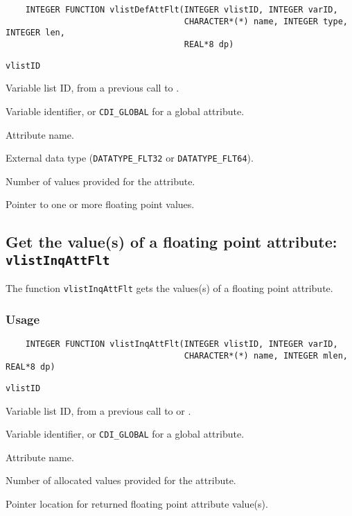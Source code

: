 \begin{verbatim}
    INTEGER FUNCTION vlistDefAttFlt(INTEGER vlistID, INTEGER varID, 
                                    CHARACTER*(*) name, INTEGER type, INTEGER len, 
                                    REAL*8 dp)
\end{verbatim}

\hspace*{4mm}\begin{minipage}[]{15cm}
\begin{deflist}{\tt vlistID\ }
\item[{\tt vlistID}]
Variable list ID, from a previous call to {}.
\item[{\tt varID}]
Variable identifier, or {\tt CDI\_GLOBAL} for a global attribute.
\item[{\tt name}]
Attribute name.
\item[{\tt type}]
External data type ({\tt DATATYPE\_FLT32} or {\tt DATATYPE\_FLT64}).
\item[{\tt len}]
Number of values provided for the attribute.
\item[{\tt dp}]
Pointer to one or more floating point values.

\end{deflist}
\end{minipage}


\subsection{Get the value(s) of a floating point attribute: {\tt vlistInqAttFlt}}
\label{vlistInqAttFlt}

The function {\tt vlistInqAttFlt} gets the values(s) of a floating point attribute.

\subsubsection*{Usage}

\begin{verbatim}
    INTEGER FUNCTION vlistInqAttFlt(INTEGER vlistID, INTEGER varID, 
                                    CHARACTER*(*) name, INTEGER mlen, REAL*8 dp)
\end{verbatim}

\hspace*{4mm}\begin{minipage}[]{15cm}
\begin{deflist}{\tt vlistID\ }
\item[{\tt vlistID}]
Variable list ID, from a previous call to {} or {}.
\item[{\tt varID}]
Variable identifier, or {\tt CDI\_GLOBAL} for a global attribute.
\item[{\tt name}]
Attribute name.
\item[{\tt mlen}]
Number of allocated values provided for the attribute.
\item[{\tt dp}]
Pointer location for returned floating point attribute value(s).

\end{deflist}
\end{minipage}


